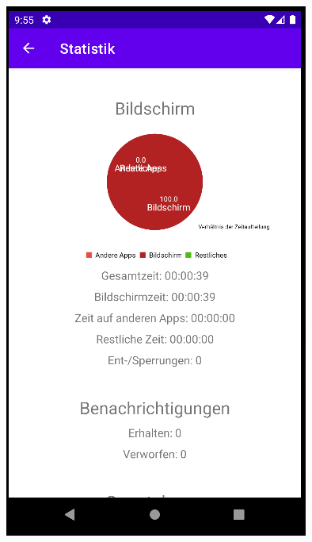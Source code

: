 \documentclass[ngerman]{tutorial}
\begin{document}
\begin{center}
    \includegraphics[scale=0.45]{stats_phase_1.png}
\end{center}
\end{document}
